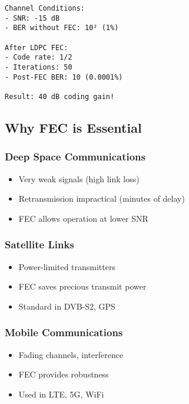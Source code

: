 \begin{verbatim}
Channel Conditions:
- SNR: -15 dB
- BER without FEC: 10² (1%)

After LDPC FEC:
- Code rate: 1/2
- Iterations: 50
- Post-FEC BER: 10 (0.0001%)

Result: 40 dB coding gain! 
\end{verbatim}

\subsection{Why FEC is Essential}\label{why-fec-is-essential}

\subsubsection{Deep Space
Communications}\label{deep-space-communications}

\begin{itemize}
\tightlist
\item
  Very weak signals (high link loss)
\item
  Retransmission impractical (minutes of delay)
\item
  FEC allows operation at lower SNR
\end{itemize}

\subsubsection{Satellite Links}\label{satellite-links}

\begin{itemize}
\tightlist
\item
  Power-limited transmitters
\item
  FEC saves precious transmit power
\item
  Standard in DVB-S2, GPS
\end{itemize}

\subsubsection{Mobile Communications}\label{mobile-communications}

\begin{itemize}
\tightlist
\item
  Fading channels, interference
\item
  FEC provides robustness
\item
  Used in LTE, 5G, WiFi
\end{itemize}

